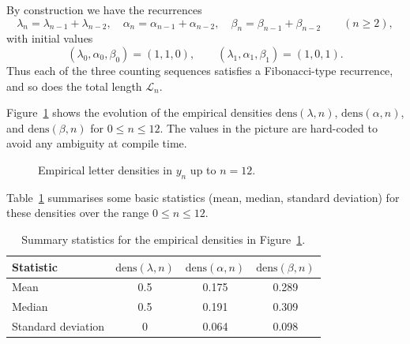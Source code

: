\documentclass[12pt]{amsart}
\begin{document}
By construction we have the recurrences
\[
\lambda_n = \lambda_{n-1} + \lambda_{n-2},\quad
\alpha_n = \alpha_{n-1} + \alpha_{n-2},\quad
\beta_n = \beta_{n-1} + \beta_{n-2}\qquad (n\ge 2),
\]
with initial values
\[
(\lambda_0,\alpha_0,\beta_0) = (1,1,0),\qquad
(\lambda_1,\alpha_1,\beta_1) = (1,0,1).
\]
Thus each of the three counting sequences satisfies a Fibonacci-type recurrence, and so does the total length $\mathcal{L}_n$.

Figure~\ref{figdensn1} shows the evolution of the empirical densities
\(\mathrm{dens}(\lambda,n)\), \(\mathrm{dens}(\alpha,n)\), and \(\mathrm{dens}(\beta,n)\) for $0\le n\le 12$. The values in the picture are hard-coded to avoid any ambiguity at compile time.

\begin{figure}[H]
    \centering
{}
    \caption{Empirical letter densities in $y_n$ up to $n=12$.}
    \label{figdensn1}
\end{figure}

Table~\ref{tabdensn1} summarises some basic statistics (mean, median, standard deviation) for these densities over the range $0\le n\le 12$.

\begin{table}[H]
    \centering
    \begin{tabular}{|l|c|c|c|}
  \hline
Statistic            & $\mathrm{dens}(\lambda,n)$ & $\mathrm{dens}(\alpha,n)$ & $\mathrm{dens}(\beta,n)$ \\ \hline
Mean                 & 0.5 & 0.175 & 0.289 \\ \hline
Median               & 0.5 & 0.191 & 0.309 \\ \hline
Standard deviation   & 0 & 0.064 & 0.098 \\ \hline
\end{tabular}
    \caption{Summary statistics for the empirical densities in Figure~\ref{figdensn1}.}
    \label{tabdensn1}
\end{table}
\end{document}

